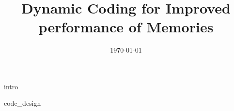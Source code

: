 \documentclass[pageno]{jpaper}
\begin{document}
\title{Dynamic Coding for Improved performance of Memories }
\author{
}

\date{\normalsize\today}  %
\maketitle

\begin{abstract}
 
\end{abstract}


 {intro}



 {code_design}



{ 

\renewcommand{\bibfont}{\normalfont\small}

}
\end{document}
